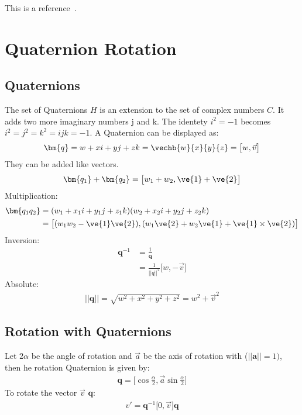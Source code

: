 
This is a reference~\cite{Foley:1990}.
\section{Quaternion Rotation}
\subsection{Quaternions}
The set of Quaternions $H$ is an extension to the set of complex numbers $C$. It adds two more imaginary numbers j and k. The identety $i^2 = -1$ becomes $i^2 = j^2=k^2=ijk=-1$. A Quaternion can be displayed as: 
\begin{align}
\bm{q}=w+xi+yj+zk= \vechb{w}{x}{y}{z}=\big[w,\vec{v}\big]
\end{align}
They can be added like vectors.
\begin{align}
\bm{q_1} + \bm{q_2} =\big[w_1+w_2,\ve {1}+\ve {2}\big]
\end{align}
Multiplication:
\begin{align}
\bm{q_1 q_2}&= (w_1+x_1i+y_1j+z_1k)(w_2+x_2i+y_2j+z_2k)\\
&=\big[(w_1w_2 - \ve {1} \ve{2}),
(w_1\ve{2} + w_2\ve{1} + \ve{1}\times\ve{2})
\big]
\end{align}
Inversion:
\begin{align}
\bm{q}^{-1} &= \frac{1}{\bm{q}}\\
&= \frac{1}{||q||^2}\big[w,-\vec{v}\big]
\end{align}
Absolute:
\begin{align}
||\bm q|| = \sqrt{w^2+x^2+y^2+z^2}=w^2+\vec{v}^2
\end{align}
\cite{Quat}


\subsection{Rotation with Quaternions}
Let $2\alpha$ be the angle of rotation and $\vec{a}$ be the axis of rotation with ($||\bm{a} || = 1)$, then he rotation Quaternion is given by:
\begin{align}
\bm {q}=
\big[
	\cos\frac{\alpha}{2}, \vec{a} \sin\frac{\alpha}{2}
\big]
\end{align}
To rotate the vector $\vec{v}$ $\bm{q}$:
\begin{align}
v'=\bm{q}^{-1}\big[0,\vec{v}\big]\bm {q}
\end{align}
